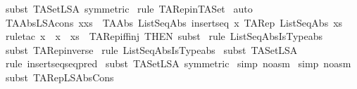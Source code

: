 \begin{isabellebody}
%
\isadelimproof
%
\endisadelimproof
%
\isatagproof
{}\isamarkupfalse%
\ {\isacharparenleft}subst\ TASet{\isacharunderscore}LSA\ {\isacharbrackleft}symmetric{\isacharbrackright}{\isacharparenright}\isanewline
{}\isamarkupfalse%
\ {\isacharparenleft}rule\ TARep{\isacharunderscore}in{\isacharunderscore}TASet{\isacharparenright}\isanewline
{}\isamarkupfalse%
\ auto\isanewline
{}\isamarkupfalse%
%
\endisatagproof
{\isafoldproof}%
%
\isadelimproof
\isanewline
%
\endisadelimproof
\isanewline
\isanewline
{}\isamarkupfalse%
\ TAAbs{\isacharunderscore}LSA{\isacharunderscore}cons{\isacharcolon}\ {\isachardoublequoteopen}{\isacharparenleft}x{\isacharhash}xs{\isacharparenright}\ {\isacharequal}\ TAAbs\ ListSeqAbs\ {\isacharparenleft}insertseq\ x\ {\isacharparenleft}TARep\ ListSeqAbs\ xs{\isacharparenright}{\isacharparenright}{\isachardoublequoteclose}\isanewline
%
\isadelimproof
%
\endisadelimproof
%
\isatagproof
{}\isamarkupfalse%
\ {\isacharparenleft}rule{\isacharunderscore}tac\ x{}\ {\isacharequal}\ {\isachardoublequoteopen}x\ {\isacharhash}\ xs{\isachardoublequoteclose}\ \ TARep{\isacharunderscore}iff{\isacharunderscore}inj\ {\isacharbrackleft}THEN\ subst{\isacharbrackright}{\isacharparenright}\isanewline
{}\isamarkupfalse%
\ {\isacharparenleft}rule\ ListSeqAbsIsTypeabs{\isacharparenright}\isanewline
{}\isamarkupfalse%
\ {\isacharparenleft}subst\ TARep{\isacharunderscore}inverse{\isacharparenright}\isanewline
{}\isamarkupfalse%
\ {\isacharparenleft}rule\ ListSeqAbsIsTypeabs{\isacharparenright}\isanewline
{}\isamarkupfalse%
\ {\isacharparenleft}subst\ TASet{\isacharunderscore}LSA{\isacharparenright}\isanewline
{}\isamarkupfalse%
\ {\isacharparenleft}rule\ insertseq{\isacharunderscore}seq{\isacharunderscore}pred{\isacharparenright}\isanewline
{}\isamarkupfalse%
\ {\isacharparenleft}subst\ TASet{\isacharunderscore}LSA\ {\isacharbrackleft}symmetric{\isacharbrackright}{\isacharparenright}\isanewline
{}\isamarkupfalse%
\ {\isacharparenleft}simp\ {\isacharparenleft}no{\isacharunderscore}asm{\isacharparenright}{\isacharparenright}\isanewline
{}\isamarkupfalse%
\ {\isacharparenleft}simp\ {\isacharparenleft}no{\isacharunderscore}asm{\isacharparenright}{\isacharparenright}\isanewline
{}\isamarkupfalse%
\ {\isacharparenleft}subst\ TARep{\isacharunderscore}LSAbs{\isacharunderscore}Cons{\isacharparenright}\isanewline

\end{isabellebody}

